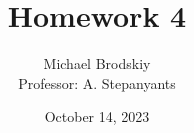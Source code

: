 


\title{Homework 4}
\date{October 14, 2023}
\author{Michael Brodskiy\\ \small Professor: A. Stepanyants}



\maketitle

